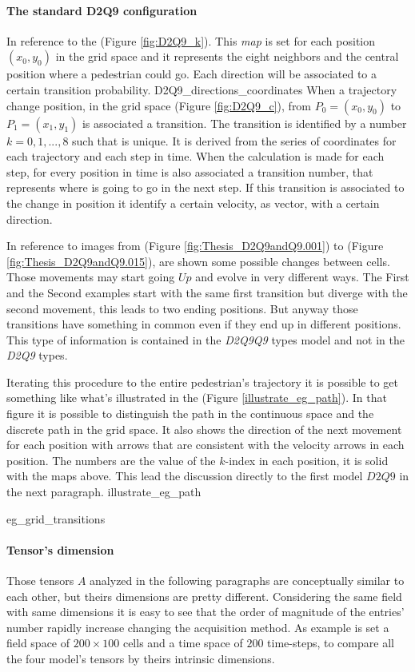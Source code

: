 \documentclass[class=article, crop=false]{standalone}
\begin{document}
\paragraph{The standard D2Q9 configuration} 
In reference to the (Figure \ref{fig:D2Q9_k}).
This \emph{map} is set for each position $(x_0, y_0)$ in the grid space and it represents the eight neighbors and the central position where a pedestrian could go.
Each direction will be associated to a certain transition probability.
	{D2Q9_directions_coordinates}
When a trajectory change position, in the grid space (Figure \ref{fig:D2Q9_c}), from $P_0=(x_0, y_0)$ to $P_1=(x_1, y_1)$ is associated a transition.
The transition is identified by a number $k = 0,1,...,8$ such that is unique.
It is derived from the series of coordinates for each trajectory and each step in time.
When the calculation is made for each step, for every position in time is also associated a transition number, that represents where is going to go in the next step.
If this transition is associated to the change in position it identify a certain velocity, as vector, with a certain direction.

In reference to images from (Figure \ref{fig:Thesis_D2Q9andQ9.001})  to  (Figure \ref{fig:Thesis_D2Q9andQ9.015}), are shown some possible changes between cells.
Those movements may start going $Up$ and evolve in very different ways.
The First and the Second examples start with the same first transition but diverge with the second movement, this leads to two ending positions.
But anyway those transitions have something in common even if they end up in different positions.
This type of information is contained in the \emph{D2Q9Q9} types model and not in the \emph{D2Q9} types.

Iterating this procedure to the entire pedestrian's trajectory it is possible to get something like what's illustrated in the (Figure \ref{illustrate_eg_path}).
In that figure it is possible to distinguish the path in the continuous space and the discrete path in the grid space.
It also shows the direction of the next movement for each position with arrows that are consistent with the velocity arrows in each position.
The numbers are the value of the $k$-index in each position, it is solid with the maps above.
This lead the discussion directly to the first model $D2Q9$ in the next paragraph.
	{illustrate_eg_path}

	{eg_grid_transitions}

\paragraph{Tensor's dimension}
Those tensors $A$ analyzed in the following paragraphs are conceptually similar to each other, but theirs dimensions are pretty different.
Considering the same field with same dimensions it is easy to see that the order of magnitude of the entries' number rapidly increase changing the acquisition method.
As example is set a field space of $200\times100$ cells and a time space of $200$ time-steps, to compare all the four model's tensors by theirs intrinsic dimensions.
\end{document}
